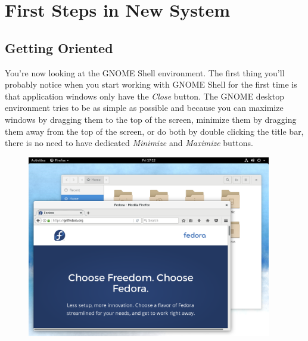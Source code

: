 \chapter*{First Steps in New System}
\section*{Getting Oriented}

You're now looking at the GNOME Shell environment. The first thing you'll probably notice when you start working with GNOME Shell for the first time is that application windows only have the \emph{Close} button. The GNOME desktop environment tries to be as simple as possible and because you can maximize windows by dragging them to the top of the screen, minimize them by dragging them away from the top of the screen, or do both by double clicking the title bar, there is no need to have dedicated \emph{Minimize} and \emph{Maximize} buttons.

\begin{figure}[ht]
\begin{center}
\includegraphics[width=0.95\textwidth]{img/shell-a}
 \label{fig:shell-a}
\end{center}
\end{figure}

